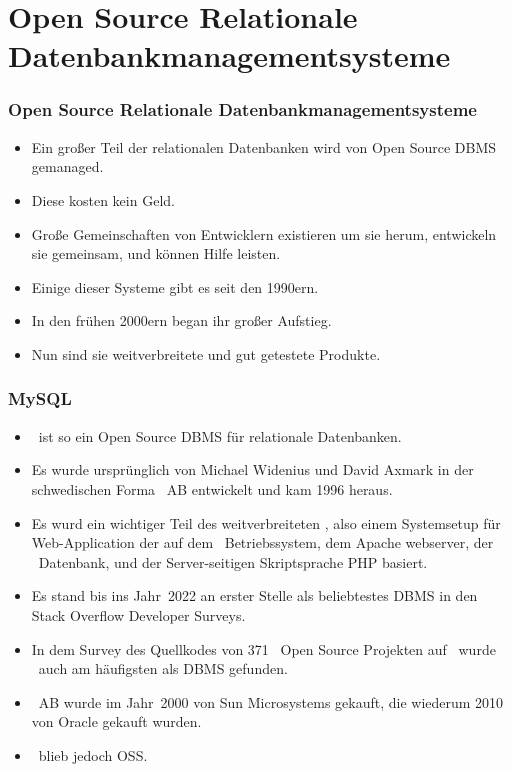 \documentclass[aspectratio=169,mathserif,notheorems]{beamer}%
\begin{document}
\section{Open Source Relationale Datenbankmanagementsysteme}%
%
\begin{frame}%
\frametitle{Open Source Relationale Datenbankmanagementsysteme}%
\begin{itemize}%
\item Ein großer Teil der relationalen Datenbanken wird von Open Source DBMS gemanaged.%
\item<2-> Diese kosten kein Geld.%
\item<3-> Große Gemeinschaften von Entwicklern existieren um sie herum, entwickeln sie gemeinsam, und können Hilfe leisten.%
\item<4-> Einige dieser Systeme gibt es seit den 1990ern.%
\item<5-> In den frühen 2000ern began ihr großer Aufstieg\cite{P2004OSDMITM}.%
\item<6-> Nun sind sie weitverbreitete und gut getestete Produkte\cite{C20245YOQ}.%
\end{itemize}%
\end{frame}%
%
\begin{frame}%
\frametitle{MySQL}%
\begin{itemize}%
\item \mysql\ ist so ein Open Source DBMS für relationale Datenbanken\cite{WAM2002MRMDFTS,TA2024DDAMWPAM,BT2021HPM,RGS2021BTOTONAMDFPC,D2015LMAM}.%
\item<2-> Es wurde ursprünglich von Michael Widenius und David Axmark in der schwedischen Forma \mysql~AB entwickelt und kam 1996 heraus\cite{C20245YOQ}.%
\item<3-> Es wurd ein wichtiger Teil des weitverbreiteten \lampStack, also einem Systemsetup für Web-Application der auf dem \linux\ Betriebssystem, dem Apache webserver, der \mysql\ Datenbank, und der Server-seitigen Skriptsprache PHP basiert\cite{C2022HAFTLS,H2020ULU2E}.%
\item<4-> Es stand bis ins Jahr~2022 an erster Stelle als beliebtestes DBMS in den Stack Overflow Developer Surveys\cite{SE:SO:2024DS}.
\item<5-> In dem Survey\cite{PMPVEPWGSMB2025ATAODMSTTHOOSP} des Quellkodes von 371~ Open Source  Projekten auf \github\ wurde \mysql\ auch am häufigsten als DBMS gefunden.%
\item<6-> \mysql~AB wurde im Jahr~2000 von Sun Microsystems gekauft, die wiederum 2010 von Oracle gekauft wurden\cite{C20245YOQ}.%
\item<7-> \mysql\ blieb jedoch OSS.%
\end{itemize}%
\end{frame}%
\end{document}
